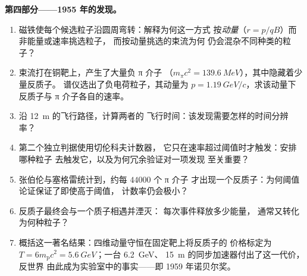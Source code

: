 \begin{problem}
\medskip\noindent\textbf{第四部分——1955 年的发现。}
\begin{enumerate}[resume]
  \item 磁铁使每个候选粒子沿圆周弯转：解释为何这一方式
        按\emph{动量}（$r = p/qB$）而非能量或速率挑选粒子，
        而按动量挑选的束流为何
        仍会混杂不同种类的粒子？
  \item 束流打在铜靶上，产生了大量负 π 介子
        （$m_\pi c^2 = \qty{139.6}{MeV}$），其中隐藏着少量反质子。
        谱仪选出了负电荷粒子，其动量为
        $p = \qty{1.19}{GeV}/c$，求该动量下
        反质子与 π 介子各自的速率。
  \item 沿 \qty{12}{m} 的飞行路径，计算两者的
        飞行时间：该发现需要怎样的时间分辨率？
  \item 第二个独立判据使用切伦科夫计数器，
        它只在速率超过阈值时才触发：安排哪种粒子
        去触发它，以及为何冗余验证对一项发现
        至关重要？
  \item 张伯伦与塞格雷统计到，约每 $\num{44000}$ 个 π 介子
        才出现一个反质子：为何阈值论证保证了即使高于阈值，
        计数率仍会极小？
  \item 反质子最终会与一个质子相遇并湮灭：
        每次事件释放多少能量，
        通常又转化为何种粒子？
  \item 概括这一著名结果：四维动量守恒在固定靶上将反质子的
        价格标定为 $T = 6m_{\text{p}}c^2 =
        \qty{5.6}{GeV}$；一台 \qty{6.2}{GeV}、
        \qty{15}{m} 的同步加速器付出了这一代价，反世界
        由此成为实验室中的事实——即 1959 年诺贝尔奖。
\end{enumerate}
\end{problem}
